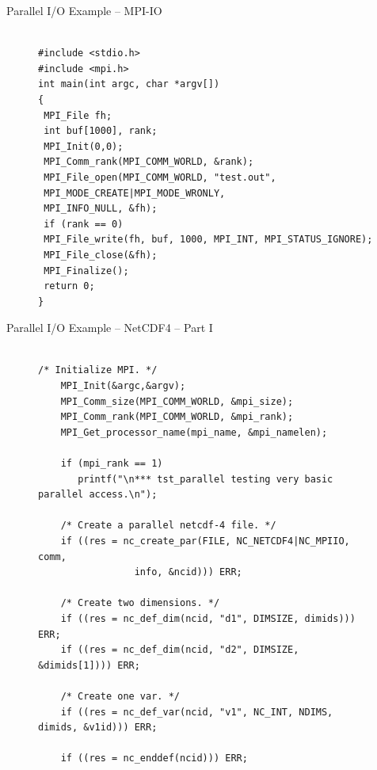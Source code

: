 \documentclass[compress,11pt,xcolor=svgnames,aspectratio=169]{beamer}
\begin{document}
\begin{frame}[fragile]{Parallel I/O Example -- MPI-IO}

\begin{figure}
\centering
\begin{varwidth}{\linewidth}
{ \tiny

\begin{verbatim}

#include <stdio.h>
#include <mpi.h>
int main(int argc, char *argv[])
{
 MPI_File fh;
 int buf[1000], rank;
 MPI_Init(0,0);
 MPI_Comm_rank(MPI_COMM_WORLD, &rank);
 MPI_File_open(MPI_COMM_WORLD, "test.out",
 MPI_MODE_CREATE|MPI_MODE_WRONLY,
 MPI_INFO_NULL, &fh);
 if (rank == 0)
 MPI_File_write(fh, buf, 1000, MPI_INT, MPI_STATUS_IGNORE);
 MPI_File_close(&fh);
 MPI_Finalize();
 return 0;
}

\end{verbatim}

}
\end{varwidth}
\end{figure}

\end{frame}

\begin{frame}[fragile]{Parallel I/O Example -- NetCDF4 -- Part I}

\begin{figure}
\centering
\begin{varwidth}{\linewidth}
{ \tiny

\begin{verbatim}

/* Initialize MPI. */
    MPI_Init(&argc,&argv);
    MPI_Comm_size(MPI_COMM_WORLD, &mpi_size);
    MPI_Comm_rank(MPI_COMM_WORLD, &mpi_rank);
    MPI_Get_processor_name(mpi_name, &mpi_namelen);

    if (mpi_rank == 1)
       printf("\n*** tst_parallel testing very basic parallel access.\n");

    /* Create a parallel netcdf-4 file. */
    if ((res = nc_create_par(FILE, NC_NETCDF4|NC_MPIIO, comm,
			     info, &ncid))) ERR;

    /* Create two dimensions. */
    if ((res = nc_def_dim(ncid, "d1", DIMSIZE, dimids))) ERR;
    if ((res = nc_def_dim(ncid, "d2", DIMSIZE, &dimids[1]))) ERR;

    /* Create one var. */
    if ((res = nc_def_var(ncid, "v1", NC_INT, NDIMS, dimids, &v1id))) ERR;

    if ((res = nc_enddef(ncid))) ERR;

\end{verbatim}

}
\end{varwidth}
\end{figure}

\end{frame}
\end{document}

